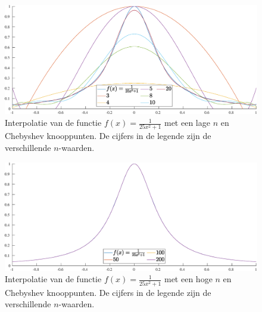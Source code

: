 \documentclass[a4paper, 12pt, titlepage, fleqn]{article}
\begin{document}
\begin{figure}
\centering
\includegraphics[scale=0.4]{../Afbeeldingen/runge_nul_laag.eps}
\caption[Runge interpolatie, weinig Chebyshev knooppunten ]{Interpolatie van de functie $f(x) = \frac{1}{25x^2+1}$ met een lage $n$ en Chebyshev knooppunten. De cijfers in de legende zijn de verschillende $n$-waarden.}
\label{fig:lageNRungeNul}
\end{figure}

\begin{figure}
\centering
\includegraphics[scale=0.4]{../Afbeeldingen/runge_nul_hoog.eps}
\caption[Runge interpolatie, veel Chebyshev knooppunten ]{Interpolatie van de functie $f(x) = \frac{1}{25x^2+1}$ met een hoge $n$ en Chebyshev knooppunten. De cijfers in de legende zijn de verschillende $n$-waarden.}
\label{fig:hogeNRungeNul}
\end{figure}

\newpage
\end{document}
